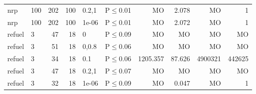 \begin{longtable}{llrrllrrrr}
 nrp           & 100      &    	202 & 100 & 0.2,1 & P$\leq$0.01  & MO       & 2.078    & MO      & 1      \\
 nrp           & 100      &    	202 & 100 & 1e-06 & P$\leq$0.01  & MO       & 2.072    & MO      & 1      \\
 refuel        & 3        &     	47 &  18 & 0     & P$\leq$0.09  & MO       & MO       & MO      & MO     \\
 refuel        & 3        &     	51 &  18 & 0,0.8 & P$\leq$0.06  & MO       & MO       & MO      & MO     \\
 refuel        & 3        &     	34 &  18 & 0.1   & P$\leq$0.06  & 1205.357 & 87.626   & 4900321 & 442625 \\
 refuel        & 3        &     	47 &  18 & 0.2,1 & P$\leq$0.07  & MO       & MO       & MO      & MO     \\
 refuel        & 3        &     	32 &  18 & 1e-06 & P$\leq$0.09  & MO       & 0.047    & MO      & 1      \\
\bottomrule
\end{longtable}

